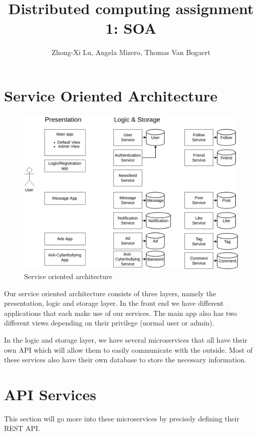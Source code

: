 \documentclass{article}
\title{Distributed computing assignment 1: SOA}
\author{Zhong-Xi Lu, Angela Mizero, Thomas Van Bogaert}
\date{}
\begin{document}
\maketitle

\section{Service Oriented Architecture}

\begin{figure}[H]
    \centering
    \includegraphics[width=\textwidth]{DC.png}
    \caption{Service oriented architecture}
    \label{soa}
\end{figure}

Our service oriented architecture consists of three layers, namely the presentation, logic and storage layer. In the front end we have different applications that each make use of our services. The main app also has two different views depending on their privilege (normal user or admin).

In the logic and storage layer, we have several microservices that all have their own API which will allow them to easily communicate with the outside. Most of these services also have their own database to store the necessary information. 

\section{API Services}

This section will go more into these microservices by precisely defining their REST API.
\end{document}
